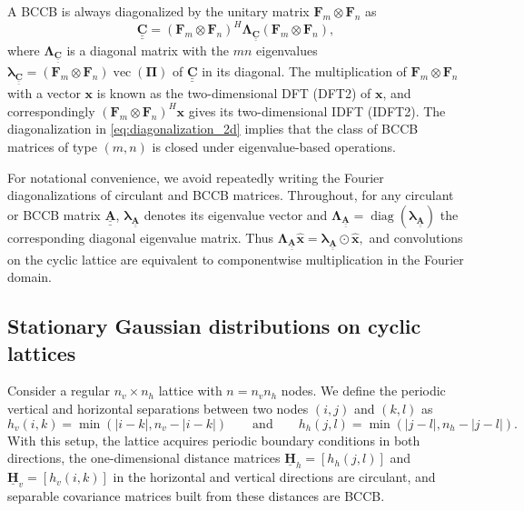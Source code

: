 \documentclass[12pt]{article}
\newcommand{\mycirc}[1] {\underline{\bm{#1}}}
\newcommand{\mybcirc}[1] {\underline{\underline{\bm{#1}}}}
\begin{document}
A BCCB is always diagonalized by the unitary matrix $\bm{F}_m \otimes \bm{F}_n$ as 
\begin{equation} \label{eq:diagonalization_2d}
    \mybcirc{C} = (\bm{F}_m \otimes \bm{F}_n)^H \bm{\Lambda}_{\mybcirc{C}}(\bm{F}_m \otimes \bm{F}_n),
\end{equation}
where $\bm{\Lambda}_{\mybcirc{C}}$ is a diagonal matrix with the $mn$ eigenvalues $\bm{\lambda}_{\mybcirc{C}} = (\bm F_m \otimes \bm F_n)\operatorname{vec}(\bm\Pi)$ of $\mybcirc{C}$ in its diagonal. 
The multiplication of $\bm{F}_m \otimes \bm{F}_n$ with a vector $\bm{x}$ is known as the two-dimensional DFT (DFT2) of $\bm{x}$, and correspondingly $(\bm{F}_m \otimes \bm{F}_n)^H\bm{x}$ gives its two-dimensional IDFT (IDFT2). 
The diagonalization in \eqref{eq:diagonalization_2d}
implies that the class of BCCB matrices of type $(m, n)$ is closed under eigenvalue-based operations.

For notational convenience, we avoid repeatedly writing the Fourier diagonalizations of circulant and BCCB matrices. Throughout, for any circulant or BCCB matrix $\mybcirc{A}$, $\bm{\lambda}_{\mybcirc{A}}$ denotes its eigenvalue vector and
$\bm{\Lambda}_{\mybcirc{A}}=\operatorname{diag}(\bm{\lambda}_{\mybcirc{A}})$
the corresponding diagonal eigenvalue matrix. Thus
$
\bm{\Lambda}_{\mybcirc{A}}\hat{\bm{x}}
=
\bm{\lambda}_{\mybcirc{A}}\odot\hat{\bm{x}},
$
and convolutions on the cyclic lattice are equivalent to componentwise multiplication in the Fourier domain.

\subsection{Stationary Gaussian distributions on cyclic lattices}

Consider a regular $n_v \times n_h$ lattice with $n=n_v n_h$ nodes. We define the periodic vertical and horizontal separations between two nodes $(i,j)$ and $(k,l)$ as
\[
    h_v(i,k)=\min(|i-k|,n_v-|i-k|)
    \qquad \mbox{and} \qquad
    h_h(j,l)=\min(|j-l|,n_h-|j-l|).
\]
With this setup, the lattice acquires periodic boundary conditions in both directions, the one-dimensional distance matrices $\mycirc{H}_h=[h_h(j,l)]$ and $\mycirc{H}_v=[h_v(i,k)]$ in the horizontal and vertical directions are circulant, and separable covariance matrices built from these distances are BCCB.

\end{document}
